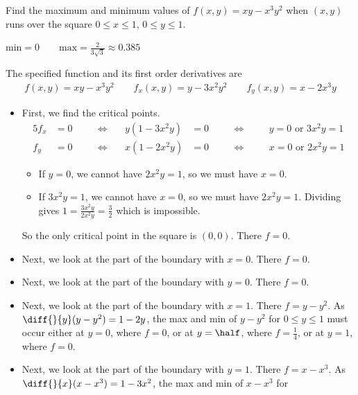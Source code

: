 \begin{question}
Find the maximum and minimum values of $f(x,y)=xy-x^3y^2$ when $(x,y)$
runs over the square $0\le x\le 1$, $0\le y\le 1$.
\end{question}

%

\begin{answer}
$\text{min}=0\qquad
\text{max}=\frac{2}{3\sqrt{3}}\approx0.385$
\end{answer}

\begin{solution}
The specified function and its first order derivatives are
\begin{align*}
f(x,y)=xy-x^3y^2\qquad
f_x(x,y)=y-3x^2y^2\qquad
f_y(x,y)=x-2x^3y
\end{align*}
\begin{itemize}
\item
First, we find the critical points.
\begin{alignat*}{5}
f_x&=0 & &\quad\iff\quad  &y(1-3x^2y)&=0 & 
         &\quad\iff\quad & &y=0 \text{ or } 3x^2y=1 \\
f_y&=0 & &\quad\iff\quad  &x(1-2x^2y)&=0 & 
         &\quad\iff\quad & &x=0 \text{ or } 2x^2y=1 
\end{alignat*}
\begin{itemize}
\item
If $y=0$, we cannot have $2x^2y=1$, so we must have $x=0$.
\item
If $3x^2y=1$, we cannot have $x=0$, so we must have $2x^2y=1$. Dividing
gives $1=\frac{3x^2y}{2x^2y}=\frac{3}{2}$ which is impossible.
\end{itemize}
So the only critical point in the square is $(0,0)$. There $f=0$.
\item
Next, we look at the part of the boundary with $x=0$. There $f=0$.
\item
Next, we look at the part of the boundary with $y=0$. There $f=0$.
\item
Next, we look at the part of the boundary with $x=1$. There $f=y-y^2$.
As $\diff{}{y}(y-y^2)=1-2y$, the max and min of $y-y^2$ for 
$0\le y\le 1$ must occur either at $y=0$, where $f=0$, or at $y=\half$, 
where $f=\frac{1}{4}$, or at $y=1$, where $f=0$.
\item
Next, we look at the part of the boundary with $y=1$. There $f=x-x^3$.
As $\diff{}{x}(x-x^3)=1-3x^2$, the max and min of $x-x^3$ for 

\end{itemize}
\end{solution}
